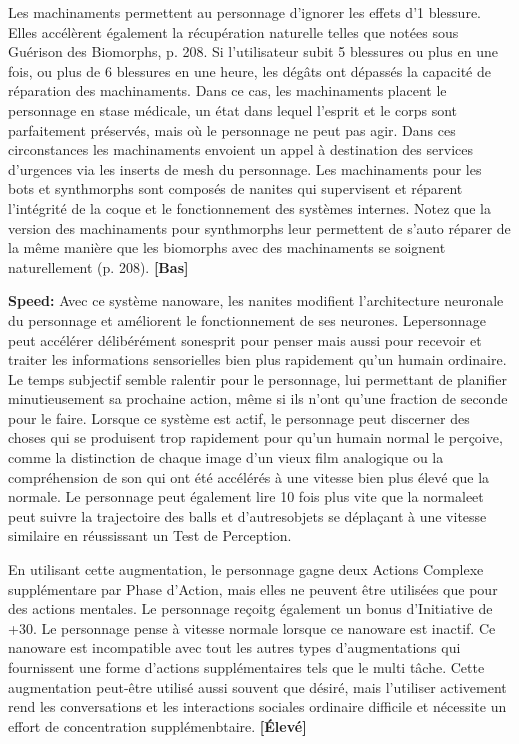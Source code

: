 Les machinaments permettent au personnage d'ignorer les effets d'1 blessure. Elles accélèrent également la récupération naturelle telles que notées sous Guérison des Biomorphs, p. 208. Si l'utilisateur subit 5 blessures ou plus en une fois, ou plus de 6 blessures en une heure, les dégâts ont dépassés la capacité de réparation des machinaments. Dans ce cas, les machinaments placent le personnage en stase médicale, un état dans lequel l'esprit et le corps sont parfaitement préservés, mais où le personnage ne peut pas agir. Dans ces circonstances les machinaments envoient un appel à destination des services d'urgences via les inserts de mesh du personnage. Les machinaments pour les bots et synthmorphs sont composés de nanites qui supervisent et réparent l'intégrité de la coque et le fonctionnement des systèmes internes. Notez que la version des machinaments pour synthmorphs leur permettent de s'auto réparer de la même manière que les biomorphs avec des machinaments se soignent naturellement (p. 208). \textbf{[Bas]} 

\textbf{Speed:} Avec ce système nanoware, les nanites modifient l'architecture neuronale du personnage et améliorent le fonctionnement de ses neurones. Lepersonnage peut accélérer délibérément sonesprit pour penser mais aussi pour recevoir et traiter les informations sensorielles bien plus rapidement qu'un humain ordinaire. Le temps subjectif semble ralentir pour le personnage, lui permettant de planifier minutieusement sa prochaine action, même si ils n'ont qu'une fraction de seconde pour le faire. Lorsque ce système est actif, le personnage peut discerner des choses qui se produisent trop rapidement pour qu'un humain normal le perçoive, comme la distinction de chaque image d'un vieux film analogique ou la compréhension de son qui ont été accélérés à une vitesse bien plus élevé que la normale. Le personnage peut également lire 10 fois plus vite que la normaleet peut suivre la trajectoire des balls et d'autresobjets se déplaçant à une vitesse similaire en réussissant un Test de Perception. 

En utilisant cette augmentation, le personnage gagne deux Actions Complexe supplémentare par Phase d'Action, mais elles ne peuvent être utilisées que pour des actions mentales. Le personnage reçoitg également un bonus d'Initiative de +30. Le personnage pense à vitesse normale lorsque ce nanoware est inactif. Ce nanoware est incompatible avec tout les autres types d'augmentations qui fournissent une forme d'actions supplémentaires tels que le multi tâche. Cette augmentation peut-être utilisé aussi souvent que désiré, mais l'utiliser activement rend les conversations et les interactions sociales ordinaire difficile et nécessite un effort de concentration supplémenbtaire. \textbf{[Élevé]} 

